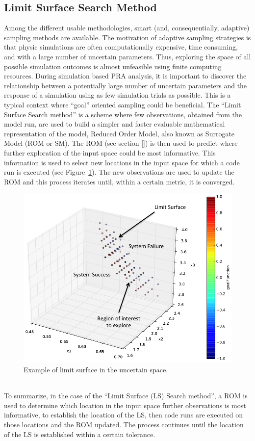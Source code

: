 \subsection{Limit Surface Search Method}
\label{sub:LS}
Among the different usable methodologies, smart (and, consequentially, adaptive) 
sampling methods are available.
The motivation of adaptive sampling strategies is that physic 
simulations are often computationally expensive, time consuming, and 
with a large number of uncertain parameters. Thus, exploring the space 
of all possible simulation outcomes is almost unfeasible using finite 
computing resources. During simulation based PRA analysis, it is 
important to discover the relationship between a potentially large 
number of uncertain parameters and the response of a simulation using 
as few simulation trials as possible.
This is a typical context where ``goal'' oriented sampling could be 
beneficial. The ``Limit 
Surface Search method'' is a scheme  where few observations, obtained 
from the model run, are used to build a simpler and faster evaluable 
mathematical representation of the model, Reduced Order Model, also 
known as Surrogate Model (ROM or SM). The ROM (see section \ref{}) is then 
used to predict where further exploration of the input space could be 
most informative. This information is used to select new locations in the 
input space for which a code run is executed (see 
Figure~\ref{fig:ExampleLSschematic}). The new 
observations are used to update the ROM and this process iterates 
until, within a certain metric, it is converged.
\begin{figure}[h!]
  \centering
  \includegraphics[width=1.0\textwidth]  {pics/ExampleLSschematic.png}
  \caption{Example of limit surface in the uncertain space.}
  \label{fig:ExampleLSschematic}
\end{figure}
\\To summarize, in the case of the ``Limit 
Surface (LS) Search method'', a ROM is used to 
determine which location in the input space further observations is most 
informative, to establish the location of the LS, then code runs are 
executed on those locations and the ROM updated. The process 
continues until the location of the LS is established within a certain tolerance.

